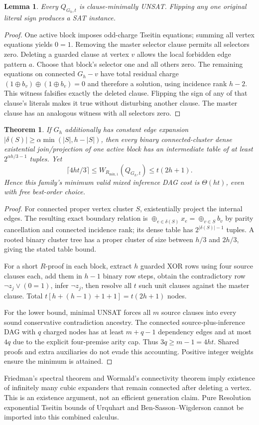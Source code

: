 \documentclass[11pt]{article}
\newtheorem{theorem}{Theorem}
\newtheorem{lemma}{Lemma}
\begin{document}
\begin{lemma}Every $Q_{G_h,t}$ is clause-minimally UNSAT. Flipping any one original literal sign produces a SAT instance.\end{lemma}
\begin{proof}
One active block imposes odd-charge Tseitin equations; summing all vertex equations yields $0=1$. Removing the master selector clause permits all selectors zero. Deleting a guarded clause at vertex $v$ allows the local forbidden edge pattern $a$. Choose that block's selector one and all others zero. The remaining equations on connected $G_h-v$ have total residual charge
$(1\oplus b_v)\oplus(1\oplus b_v)=0$ and therefore a solution, using incidence rank $h-2$. This witness falsifies exactly the deleted clause. Flipping the sign of any of that clause's literals makes it true without disturbing another clause. The master clause has an analogous witness with all selectors zero.
\end{proof}

\begin{theorem}
If $G_h$ additionally has constant edge expansion $|\delta(S)|\ge\alpha\min(|S|,h-|S|)$, then every binary connected-cluster \emph{dense} existential join/projection of one active block has an intermediate table of at least $2^{\alpha h/3-1}$ tuples. Yet
\[
\boxed{\lceil4ht/3\rceil\le W_{R_{\mathrm{mix},1}}(Q_{G_h,t})\le t(2h+1).}
\]
Hence this family's \emph{minimum} valid mixed inference DAG cost is $\Theta(ht)$, even with free best-order choice.
\end{theorem}
\begin{proof}
For connected proper vertex cluster $S$, existentially project the internal edges. The resulting exact boundary relation is $\oplus_{e\in\delta(S)}x_e=\oplus_{v\in S}b_v$ by parity cancellation and connected incidence rank; its dense table has $2^{|\delta(S)|-1}$ tuples. A rooted binary cluster tree has a proper cluster of size between $h/3$ and $2h/3$, giving the stated table bound.

For a short $R$-proof in each block, extract $h$ guarded XOR rows using four source clauses each, add them in $h-1$ binary row steps, obtain the contradictory row $\neg z_j\vee(0=1)$, infer $\neg z_j$, then resolve all $t$ such unit clauses against the master clause. Total $t[h+(h-1)+1+1]=t(2h+1)$ nodes.

For the lower bound, minimal UNSAT forces all $m$ source clauses into every sound conservative contradiction ancestry. The connected source-plus-inference DAG with $q$ charged nodes has at least $m+q-1$ dependency edges and at most $4q$ due to the explicit four-premise arity cap. Thus $3q\ge m-1=4ht$. Shared proofs and extra auxiliaries do not evade this accounting. Positive integer weights ensure the minimum is attained.
\end{proof}
Friedman's spectral theorem and Wormald's connectivity theorem imply existence of infinitely many cubic expanders that remain connected after deleting a vertex. This is an existence argument, not an efficient generation claim. Pure Resolution exponential Tseitin bounds of Urquhart and Ben-Sasson--Wigderson cannot be imported into this combined calculus.
\end{document}
